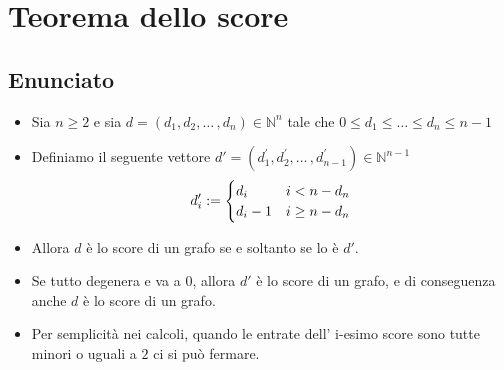 \documentclass[10pt]{article}
\begin{document}
	\newpage
	\section{Teorema dello score}
	\subsection{Enunciato}
	\begin{itemize}
	\item
	Sia $n \geq 2$ e sia $d = (d_1, d_2, \dotso\,,d_n) \in \mathbb{N}^n$ tale che $0 \leq d_1 \leq \dotso \leq d_n \leq n-1$
	\item
	Definiamo il seguente vettore $d' = (d^{'}_1, d^{'}_2, \dotso\,,d^{'}_{n-1}) \in \mathbb{N}^{n-1}$
	\begin{equation}
	d_{i}' := 
	\begin{cases}
	d_i & i < n-d_n \\
	d_i - 1 & i \geq n-d_n
	\notag
	\end{cases}
	\end{equation}
	\item
	Allora $d$ è lo score di un grafo se e soltanto se lo è $d'$.
	\item
	Se tutto degenera e va a 0, allora $d'$ è lo score di un grafo, e di conseguenza anche $d$ è lo score di un grafo.
	\item
	Per semplicità nei calcoli, quando le entrate dell' i-esimo score sono tutte minori o uguali a $2$ ci si può fermare.
	\end{itemize}
	
\end{document}
